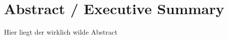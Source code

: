 
\section*{Abstract / Executive Summary}
\label{sec:abstract-executive-summary}

Hier liegt der wirklich wilde Abstract